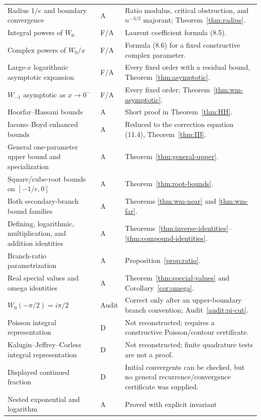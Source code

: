 \documentclass[11pt]{article}
\theoremstyle{definition}
\newcommand{\StatusF}{\textsf{F}}
\newcommand{\StatusA}{\textsf{A}}
\newcommand{\StatusD}{\textsf{D}}
\begin{document}
\begin{longtable}{>{\raggedright\arraybackslash}p{}
                  >{\centering\arraybackslash}p{}
                  >{\raggedright\arraybackslash}p{}}
Radius \(1/e\) and boundary convergence & \StatusA & Ratio modulus, critical
obstruction, and \(n^{-3/2}\) majorant; Theorem~\ref{thm:radius}.\\
Integral powers of \(W_0\) & \StatusF/\StatusA & Laurent coefficient formula
(8.5).\\
Complex powers of \(W_0/x\) & \StatusF/\StatusA & Formula (8.6) for a fixed
constructive complex parameter.\\
Large-\(x\) logarithmic asymptotic expansion & \StatusF/\StatusA & Every fixed
order with a residual bound, Theorem~\ref{thm:asymptotic}.\\
\(W_{-1}\) asymptotic as \(x\to0^-\) & \StatusF/\StatusA & Every fixed order;
Theorem~\ref{thm:wm-asymptotic}.\\
Hoorfar--Hassani bounds & \StatusA & Short proof in
Theorem~\ref{thm:HH}.\\
Iacono--Boyd enhanced bounds & \StatusA & Reduced to the correction equation
(11.4), Theorem~\ref{thm:IB}.\\
General one-parameter upper bound and specialization & \StatusA &
Theorem~\ref{thm:general-upper}.\\
Square/cube-root bounds on \([-1/e,0]\) & \StatusA &
Theorem~\ref{thm:root-bounds}.\\
Both secondary-branch bound families & \StatusA & Theorems
\ref{thm:wm-near} and \ref{thm:wm-far}.\\
Defining, logarithmic, multiplication, and addition identities & \StatusA &
Theorems~\ref{thm:inverse-identities}--\ref{thm:compound-identities}.\\
Branch-ratio parametrization & \StatusA & Proposition~\ref{prop:ratio}.\\
Real special values and omega identities & \StatusA &
Theorem~\ref{thm:special-values} and Corollary~\ref{cor:omega}.\\
\(W_0(-\pi/2)=i\pi/2\) & Audit & Correct only after an upper-boundary branch
convention; Audit~\ref{audit:pi-cut}.\\
Poisson integral representation & \StatusD & Not reconstructed; requires a
constructive Poisson/contour certificate.\\
Kalugin--Jeffrey--Corless integral representation & \StatusD & Not
reconstructed; finite quadrature tests are not a proof.\\
Displayed continued fraction & \StatusD & Initial convergents can be checked,
but no general recurrence/convergence certificate was supplied.\\
Nested exponential and logarithm & \StatusA & Proved with explicit invariant

\end{longtable}
\end{document}

